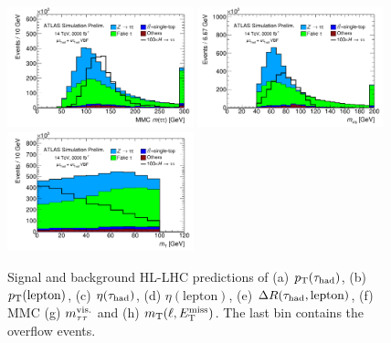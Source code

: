 \begin{figure}[!htpb]
  \includegraphics[width=0.48\textwidth]{figures/ATL-PHYS-PUB-2014-018/fig_04f}
  \includegraphics[width=0.48\textwidth]{figures/ATL-PHYS-PUB-2014-018/fig_04g}
  \includegraphics[width=0.48\textwidth]{figures/ATL-PHYS-PUB-2014-018/fig_04h}
  \caption{Signal and background HL-LHC predictions of (a) $p_{\mathrm{T}}(\tau_\text{had})$, (b) $p_{\mathrm{T}}(\text{lepton})$, (c) $\eta(\tauh)$, (d) $\eta(\text{lepton})$, (e) $\Delta R(\tau_\text{had}, \text{lepton})$, (f) MMC (g) $m_{\tau\tau}^\text{vis.}$ and (h) $m_\text{T}(\ell, E_{\mathrm{T}}^{\mathrm{miss}})$. The last bin contains the overflow events.}
  \label{fig:prospects-hllhc-taus}
\end{figure}


